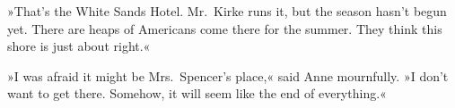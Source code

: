 »That's the White Sands Hotel. Mr.~Kirke runs it, but the season hasn't begun yet. There are heaps of Americans come there for the summer. They think this shore is just about right.«

»I was afraid it might be Mrs.~Spencer's place,« said Anne mournfully. »I don't want to get there. Somehow, it will seem like the end of everything.«